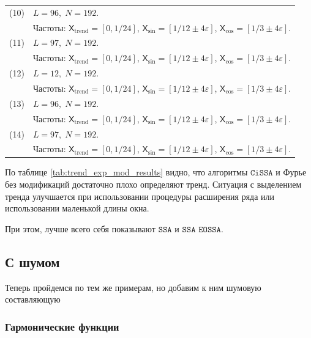 \documentclass[12pt, specialist, subf
]{disser}
\theoremstyle{definition}
\newcommand{\SSA}{\texttt{SSA}}
\newcommand{\EOSSA}{\texttt{SSA EOSSA}}
\newcommand{\CISSA}{\texttt{CiSSA}}
\newcommand{\TS}{\mathsf{X}}
\begin{document}
\begin{table}[H]
\begin{tabularx}{\textwidth}{|c|X|}
    \hline
    (10) & \(L = 96,\; N = 192\). \\
         & Частоты: \(\TS_{\text{trend}} = [0,1/24]\), \(\TS_{\sin} = [1/12\pm4\varepsilon]\), \(\TS_{\cos} = [1/3\pm4\varepsilon]\). \\
    \hline
    (11) & \(L = 97,\; N = 192\). \\
         & Частоты: \(\TS_{\text{trend}} = [0,1/24]\), \(\TS_{\sin} = [1/12\pm4\varepsilon]\), \(\TS_{\cos} = [1/3\pm4\varepsilon]\). \\
    \hline
    (12) & \(L = 12,\; N = 192\). \\
         & Частоты: \(\TS_{\text{trend}} = [0,1/24]\), \(\TS_{\sin} = [1/12\pm4\varepsilon]\), \(\TS_{\cos} = [1/3\pm4\varepsilon]\). \\
    \hline
    (13) & \(L = 96,\; N = 192\). \\
         & Частоты: \(\TS_{\text{trend}} = [0,1/24]\), \(\TS_{\sin} = [1/12\pm4\varepsilon]\), \(\TS_{\cos} = [1/3\pm4\varepsilon]\). \\
    \hline
    (14) & \(L = 97,\; N = 192\). \\
         & Частоты: \(\TS_{\text{trend}} = [0,1/24]\), \(\TS_{\sin} = [1/12\pm4\varepsilon]\), \(\TS_{\cos} = [1/3\pm4\varepsilon]\). \\
    \hline
  \end{tabularx}
\end{table}





По таблице \ref{tab:trend_exp_mod_results} видно, что алгоритмы $\CISSA$ и Фурье без модификаций достаточно плохо определяют тренд. Ситуация с выделением тренда улучшается при использовании процедуры расширения ряда или использовании маленькой длины окна.

При этом, лучше всего себя показывают $\SSA$ и $\EOSSA$. 


\subsection{С шумом}

Теперь пройдемся по тем же примерам, но добавим к ним шумовую составляющую

\subsubsection{Гармонические функции}
\end{document}
